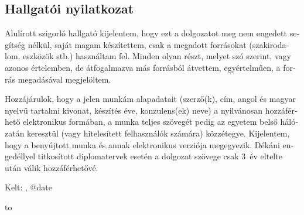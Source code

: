 \begin{otherlanguage}{magyar}

  \chapter*{Hallgatói nyilatkozat}
  \thispagestyle{plain}

  Alulírott \textbf{\authorihun} szigorló hallgató kijelentem, hogy ezt
  a dolgozatot meg nem engedett segítség nélkül, saját magam
  készítettem, csak a megadott forrásokat (szakirodalom, eszközök stb.)
  használtam fel. Minden olyan részt, melyet szó szerint, vagy azonos
  értelemben, de átfogalmazva más forrásból átvettem, egyértelműen, a
  forrás megadásával megjelöltem.

  Hozzájárulok, hogy a jelen munkám alapadatait (szerző(k), cím, angol
  és magyar nyelvű tartalmi kivonat, készítés éve, konzulens(ek) neve) a
    nyilvánosan hozzáférhető elektronikus
  formában, a munka teljes szövegét pedig az egyetem belső hálózatán
  keresztül (vagy hitelesített felhasználók számára)
  közzétegye. Kijelentem, hogy a benyújtott munka és annak elektronikus
  verziója megegyezik. Dékáni engedéllyel titkosított diplomatervek
  esetén a dolgozat szövege csak 3~év eltelte után válik hozzáférhetővé.

  \vspace{4ex}

  \noindent Kelt: \viktdklocation, \csname @date\endcsname

  \vspace{20ex}

  \hfill\begin{minipage}{0.4\linewidth}
    \centering\hbox to \par
    \centering\authorihun\par
  \end{minipage}

\end{otherlanguage}

